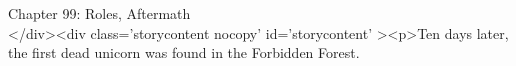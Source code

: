 
Chapter 99: Roles, Aftermath\\
</div><div  class='storycontent nocopy' id='storycontent' ><p>Ten days later, 
the first dead unicorn was found in the Forbidden Forest.